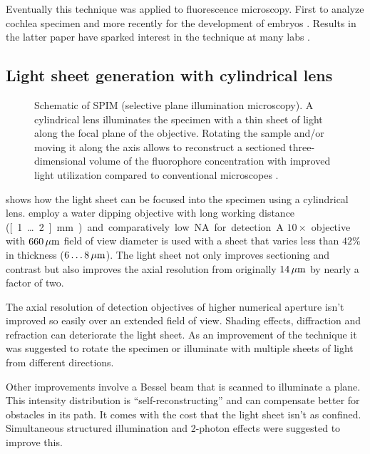 Eventually this technique was applied to fluorescence
microscopy. First to analyze cochlea specimen \citep{Voie1993} and
more recently for the development of embryos
\citep{Huisken2004}. Results in the latter paper have sparked interest
in the technique at many labs \citep{Santi2011}.
\subsection{Light sheet generation with cylindrical lens}
\begin{figure}[!hbt]
  \centering
  
  \caption{Schematic of SPIM (selective plane illumination
    microscopy). A cylindrical lens illuminates the specimen with a
    thin sheet of light along the focal plane of the
    objective. Rotating the sample and/or moving it along the axis
    allows to reconstruct a sectioned three-dimensional volume of the
    fluorophore concentration with improved light utilization compared
    to conventional microscopes \citep[inspired from][]{Huisken2004}.}
  \label{fig:spim}
\end{figure}
 shows how the light sheet can be focused into the
specimen using a cylindrical lens. \cite{Huisken2004} employ a water
dipping objective with long working distance (\unit[1\ldots 2]{mm})
and comparatively low NA for detection. A $10\times$ objective with
$\unit[660]{\mu m}$ field of view diameter is used with a sheet that
varies less than $42\%$ in thickness ($\unit[6\ldots 8]{\mu m}$). The
light sheet not only improves sectioning and contrast but also
improves the axial resolution from originally $\unit[14]{\mu m}$ by
nearly a factor of two.


The axial resolution of detection objectives of higher numerical
aperture isn't improved so easily over an extended field of
view. Shading effects, diffraction and refraction can deteriorate the
light sheet. As an improvement of the technique it was suggested to
rotate the specimen or illuminate with multiple sheets of light from
different directions.

Other improvements involve a Bessel beam that is scanned to illuminate
a plane. This intensity distribution is ``self-reconstructing'' and
can compensate better for obstacles in its path. It comes with the
cost that the light sheet isn't as confined. Simultaneous structured
illumination and 2-photon effects were suggested to improve this.


